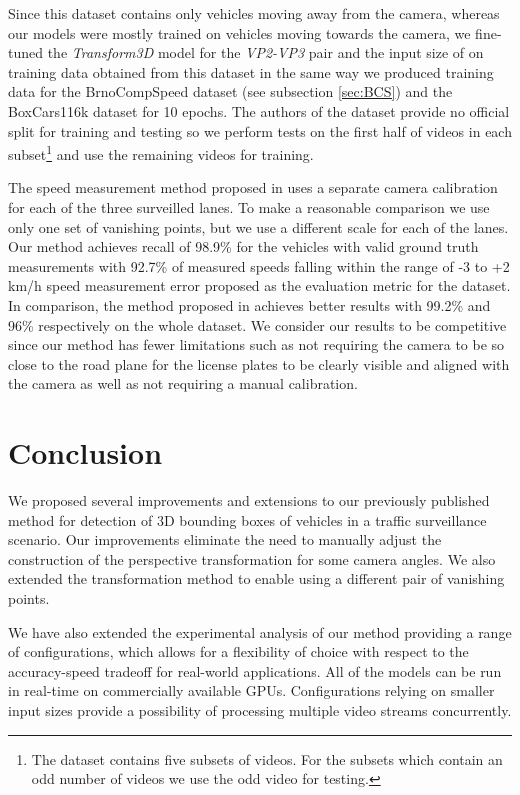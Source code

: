 \documentclass[twocolumn]{svjour3}          \smartqed  \usepackage{graphicx}
\begin{document}
Since this dataset contains only vehicles moving away from the camera, whereas our models were mostly trained on vehicles moving towards the camera, we fine-tuned the \textit{Transform3D} model for the \textit{VP2-VP3} pair and the input size of  on training data obtained from this dataset in the same way we produced training data for the BrnoCompSpeed dataset (see subsection \ref{sec:BCS}) and the BoxCars116k dataset \cite{boxcars} for 10 epochs. The authors of the dataset provide no official split for training and testing so we perform tests on the first half of videos in each subset\footnote{The dataset contains five subsets of videos. For the subsets which contain an odd number of videos we use the odd video for testing.} and use the remaining videos for training.

The speed measurement method proposed in \cite{luvizon} uses a separate camera calibration for each of the three surveilled lanes. To make a reasonable comparison we use only one set of vanishing points, but we use a different scale for each of the lanes. Our method achieves recall of 98.9\% for the vehicles with valid ground truth measurements with 92.7\% of measured speeds falling within the range of -3 to +2 km/h speed measurement error proposed as the evaluation metric for the dataset. In comparison, the method proposed in \cite{luvizon} achieves better results with 99.2\% and 96\% respectively on the whole dataset. We consider our results to be competitive since our method has fewer limitations such as not requiring the camera to be so close to the road plane for the license plates to be clearly visible and aligned with the camera as well as not requiring a manual calibration.

\section{Conclusion}

We proposed several improvements and extensions to our previously published method \cite{CVWW2019} for detection of 3D bounding boxes of vehicles in a traffic surveillance scenario. Our improvements eliminate the need to manually adjust the construction of the perspective transformation for some camera angles. We also extended the transformation method to enable using a different pair of vanishing points. 

We have also extended the experimental analysis of our method providing a range of configurations, which allows for a flexibility of choice with respect to the accuracy-speed tradeoff for real-world applications. All of the models can be run in real-time on commercially available GPUs. Configurations relying on smaller input sizes provide a possibility of processing multiple video streams concurrently.
\end{document}
